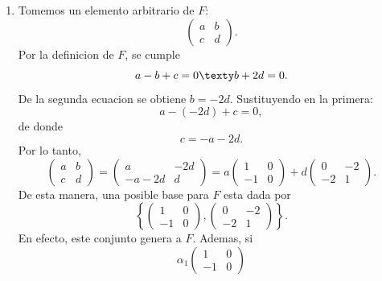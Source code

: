 \documentclass[11pt,respuestas,a4]{aleph-examen}
\begin{document}
\begin{preguntas}
\begin{respuesta}\hspace{0pt}
    \begin{enumerate}
    \item
        Tomemos un elemento arbitrario de $F$:
        \[
            \begin{pmatrix}
                a & b\\
                c & d
            \end{pmatrix}.
        \]
        Por la definicion de $F$, se cumple
        \[
            a-b+c=0
            \texty
            b+2d=0.
        \]
        De la segunda ecuacion se obtiene $b=-2d$. Sustituyendo en la primera:
        \[
            a-(-2d)+c=0,
        \]
        de donde
        \[
            c=-a-2d.
        \]
        Por lo tanto,
        \[
            \begin{pmatrix}
                a & b\\
                c & d
            \end{pmatrix}
            =
            \begin{pmatrix}
                a & -2d\\
                -a-2d & d
            \end{pmatrix}
            =
            a\begin{pmatrix}
                1 & 0\\
                -1 & 0
            \end{pmatrix}
            +
            d\begin{pmatrix}
                0 & -2\\
                -2 & 1
            \end{pmatrix}.
        \]
        De esta manera, una posible base para $F$ esta dada por
        \[
            \left\{
            \begin{pmatrix}
                1 & 0\\
                -1 & 0
            \end{pmatrix},
            \begin{pmatrix}
                0 & -2\\
                -2 & 1
            \end{pmatrix}
            \right\}.
        \]
        En efecto, este conjunto genera a $F$. Ademas, si
        \[
            \alpha_1\begin{pmatrix}
                1 & 0\\
                -1 & 0

\end{pmatrix}\]
\end{enumerate}
\end{respuesta}
\end{preguntas}
\end{document}
